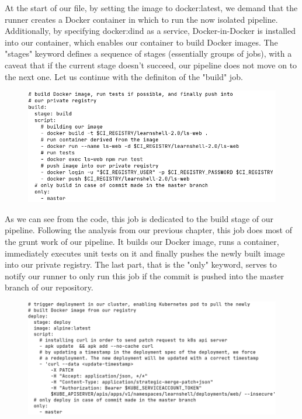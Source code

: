 \documentclass[thesis=B,english]{FITthesis}[2019/12/23]
\begin{document}
At the start of our file, by setting the image to docker:latest, we demand that the runner creates a Docker container in which to run the now isolated pipeline. Additionally, by specifying docker:dind as a service, Docker-in-Docker is installed into our container, which enables our container to build Docker images. The "stages" keyword defines a sequence of stages (essentially groups of jobs), with a caveat that if the current stage doesn't succeed, our pipeline does not move on to the next one. Let us continue with the definiton of the "build" job.

\begin{figure}[H]
\centering
\hspace*{-0.3cm}
\includegraphics[scale=0.5]{gitlab-ci-build}
\end{figure}

As we can see from the code, this job is dedicated to the build stage of our pipeline. Following the analysis from our previous chapter, this job does most of the grunt work of our pipeline. It builds our Docker image, runs a container, immediately executes unit tests on it and finally pushes the newly built image into our private registry. The last part, that is the "only" keyword, serves to notify our runner to only run this job if the commit is pushed into the master branch of our repository.

\begin{figure}[H]
\centering
\hspace*{-0.5cm}
\includegraphics[scale=0.5]{gitlab-ci-deploy}
\end{figure}
\end{document}

